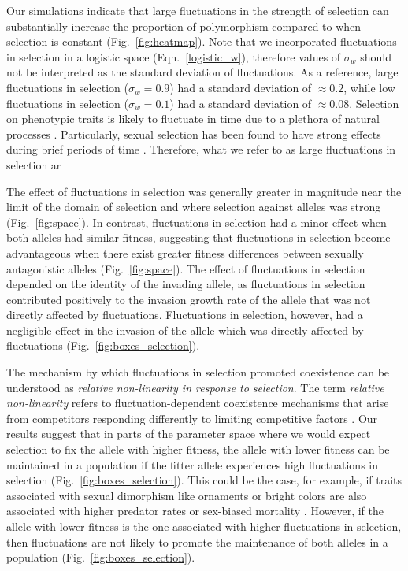 \documentclass[12pt]{article}
\begin{document}
Our simulations indicate that large fluctuations in the strength of selection can substantially increase the proportion of polymorphism compared to when selection is constant (Fig.~\ref{fig:heatmap}). Note that we incorporated fluctuations in selection in a logistic space (Eqn.~\ref{logistic_w}), therefore values of $\sigma_{w}$ should not be  interpreted as the standard deviation of fluctuations. As a reference, large fluctuations in selection ($\sigma_{w} = 0.9$) had a standard deviation of $\approx 0.2$, while low fluctuations in selection ($\sigma_{w} = 0.1$) had a standard deviation of $\approx 0.08$. Selection on phenotypic traits is likely to fluctuate in time due to a plethora of natural processes \citep{hoekstra2001strength}. Particularly, sexual selection has been found to have strong effects during brief periods of time \citep{hoekstra2001strength,kasumovic2008spatial}. Therefore, what we refer to as large fluctuations in selection  ar 

 \citep{kasumovic2008spatial}


 The effect of fluctuations in selection was generally greater in magnitude near the limit of the domain of selection and where selection against alleles was strong (Fig.~\ref{fig:space}). In contrast, fluctuations in selection had a minor effect when both alleles had similar fitness, suggesting that fluctuations in selection become advantageous when there exist greater fitness differences between sexually antagonistic alleles (Fig.~\ref{fig:space}). The effect of fluctuations in selection depended on the identity of the invading allele, as fluctuations in selection contributed positively to the invasion growth rate of the allele that was not directly affected by fluctuations. Fluctuations in selection, however, had a negligible effect in the invasion of the allele which was directly affected by fluctuations (Fig.~\ref{fig:boxes_selection}).

 The mechanism by which fluctuations in selection promoted coexistence can be understood as \textit{relative non-linearity in response to selection}. The term \textit{relative non-linearity} refers to fluctuation-dependent coexistence mechanisms that arise from competitors responding differently to limiting competitive factors \citep{chesson2000general,ellner2016quantify,zepeda2019fluctuation}. Our results suggest that in parts of the parameter space where we would expect selection to fix the allele with higher fitness, the allele with lower fitness can be maintained in a population if the fitter allele experiences high fluctuations in selection (Fig.~\ref{fig:boxes_selection}). This could be the case, for example, if traits associated with sexual dimorphism like ornaments or bright colors are also associated with higher predator rates \citep{bildstein1989consequences,gotmark1997natural} or sex-biased mortality \citep{promislow1992mortality}. However, if the allele with lower fitness is the one associated with higher fluctuations in selection, then fluctuations are not likely to promote the maintenance of both alleles in a population (Fig.~\ref{fig:boxes_selection}).
\end{document}
